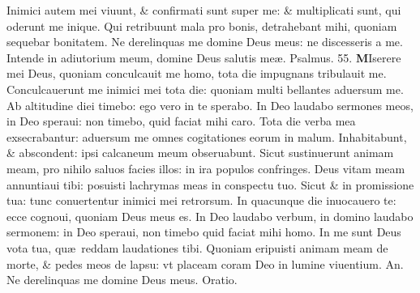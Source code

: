 \documentclass[a5paper,10pt]{book}
\def\ae{æ}
\begin{document}
\begin{multicols*}{2}
\newline \color{red} I\color{black}nimici autem mei viuunt, \& confirmati sunt super me: \& multiplicati sunt, qui oderunt me inique.
\newline \color{red} Q\color{black}ui retribuunt mala pro bonis, detrahebant mihi, quoniam sequebar bonitatem.
\newline \color{red} N\color{black}e derelinquas me domine Deus meus: ne discesseris a me.
\newline \color{red} I\color{black}ntende in adiutorium meum, domine Deus salutis me\ae . \quad \color{red} Psalmus. \hypertarget{ps55}{55.} \color{black}
\vspace{-.5em}
\lettrine[lines=2]{\bfseries \color{red} M}{}Iserere mei Deus, quoniam conculcauit me homo, tota die impugnans tribulauit me.
\newline \color{red} C\color{black}onculcauerunt me inimici mei tota die: quoniam multi bellantes aduersum me.
\newline \color{red} A\color{black}b altitudine diei timebo: ego vero in te sperabo.
\newline \color{red} I\color{black}n Deo laudabo sermones meos, in Deo speraui: non timebo, quid faciat mihi caro.
\newline \color{red} T\color{black}ota die verba mea exsecrabantur: aduersum me omnes cogitationes eorum in malum.
\newline \color{red} I\color{black}nhabitabunt, \& abscondent: ipsi calcaneum meum obseruabunt.
\newline \color{red} S\color{black}icut sustinuerunt animam meam, pro nihilo saluos facies illos: in ira populos confringes.
\newline \color{red} D\color{black}eus vitam meam annuntiaui tibi: posuisti lachrymas meas in conspectu tuo.
\newline \color{red} S\color{black}icut \& in promissione tua: tunc conuertentur inimici mei retrorsum.
\newline \color{red} I\color{black}n quacunque die inuocauero te: ecce cognoui, quoniam Deus meus es.
\newline \color{red} I\color{black}n Deo laudabo verbum, in domino laudabo sermonem: in Deo speraui, non timebo quid faciat mihi homo.
\newline \color{red} I\color{black}n me sunt Deus vota tua, qu\ae \ reddam laudationes tibi.
\newline \color{red} Q\color{black}uoniam eripuisti animam meam de morte, \& pedes meos de lapsu: vt placeam coram Deo in lumine viuentium. \color{red} An. \color{black} Ne derelinquas me domine Deus meus. \color{red} Oratio. \color{black}

\end{multicols*}
\end{document}
